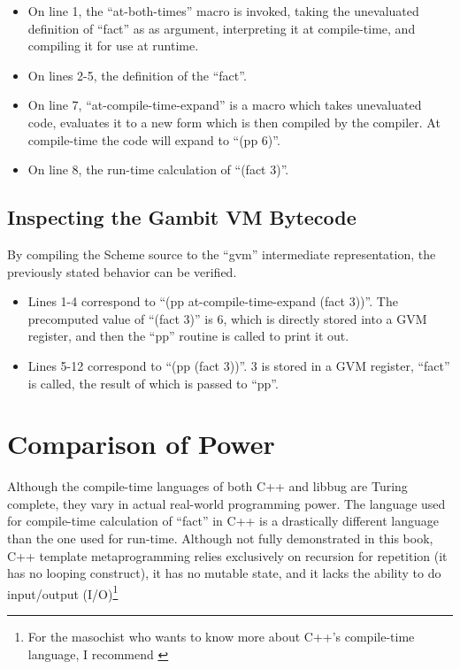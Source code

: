  \begin{itemize}
   \item
      On line 1, the ``at-both-times'' macro is invoked, taking the unevaluated
      definition of ``fact'' as
      as argument, interpreting it at compile-time, and compiling it for use at runtime.
   \item
      On lines 2-5, the definition of the ``fact''.
   \item
      On line 7, ``at-compile-time-expand'' is a macro which takes unevaluated code,
      evaluates it to a new form which is then compiled by the compiler.  At compile-time the code
      will expand to ``(pp 6)''.
   \item
      On line 8, the run-time calculation of ``(fact 3)''.
 \end{itemize}

 \subsection{Inspecting the Gambit VM Bytecode}
 By compiling the Scheme source to the ``gvm'' intermediate
 representation, the previously stated behavior can be verified.


 \begin{itemize}
   \item
      Lines 1-4 correspond to ``(pp {at-compile-time-expand (fact 3)})''.  The precomputed
      value of ``(fact 3)'' is 6, which is directly stored into a GVM register, and
      then the ``pp'' routine is called to print it out.
   \item
      Lines 5-12 correspond to ``(pp (fact 3))''.  3 is stored in a GVM register, ``fact''
      is called, the result of which is passed to ``pp''.
 \end{itemize}

 \section{Comparison of Power}

 Although the compile-time languages of both C++ and libbug are Turing complete,
 they vary in actual real-world programming power.  The language used
 for compile-time calculation of ``fact'' in C++ is a drastically different language than
 the one used for run-time.  Although not fully demonstrated in this book,
 C++ template metaprogramming relies exclusively on recursion for repetition (it has no
 looping construct), it has no mutable state, and it lacks the ability to do input/output
 (I/O)\footnote{For the masochist who wants to know more about C++'s compile-time language,
 I recommend \cite{ctm} }

